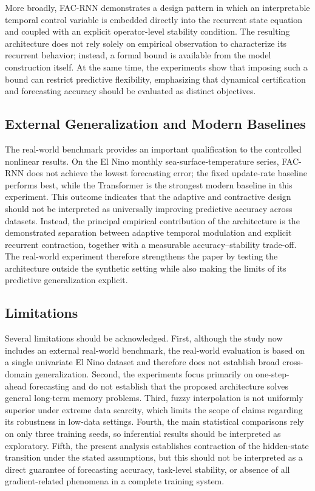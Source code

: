\documentclass[journal]{IEEEtran}
\begin{document}
	More broadly, FAC-RNN demonstrates a design pattern in which an interpretable temporal control variable is embedded directly into the recurrent state equation and coupled with an explicit operator-level stability condition. The resulting architecture does not rely solely on empirical observation to characterize its recurrent behavior; instead, a formal bound is available from the model construction itself. At the same time, the experiments show that imposing such a bound can restrict predictive flexibility, emphasizing that dynamical certification and forecasting accuracy should be evaluated as distinct objectives.
	
\subsection{External Generalization and Modern Baselines}
\label{subsec:external_generalization_discussion}

The real-world benchmark provides an important qualification to the controlled nonlinear results. On the El Nino monthly sea-surface-temperature series, FAC-RNN does not achieve the lowest forecasting error; the fixed update-rate baseline performs best, while the Transformer is the strongest modern baseline in this experiment. This outcome indicates that the adaptive and contractive design should not be interpreted as universally improving predictive accuracy across datasets. Instead, the principal empirical contribution of the architecture is the demonstrated separation between adaptive temporal modulation and explicit recurrent contraction, together with a measurable accuracy--stability trade-off. The real-world experiment therefore strengthens the paper by testing the architecture outside the synthetic setting while also making the limits of its predictive generalization explicit.

	\subsection{Limitations}
	\label{subsec:limitations}
	
	Several limitations should be acknowledged. First, although the study now includes an external real-world benchmark, the real-world evaluation is based on a single univariate El Nino dataset and therefore does not establish broad cross-domain generalization. Second, the experiments focus primarily on one-step-ahead forecasting and do not establish that the proposed architecture solves general long-term memory problems. Third, fuzzy interpolation is not uniformly superior under extreme data scarcity, which limits the scope of claims regarding its robustness in low-data settings. Fourth, the main statistical comparisons rely on only three training seeds, so inferential results should be interpreted as exploratory. Fifth, the present analysis establishes contraction of the hidden-state transition under the stated assumptions, but this should not be interpreted as a direct guarantee of forecasting accuracy, task-level stability, or absence of all gradient-related phenomena in a complete training system.
	
\end{document}
